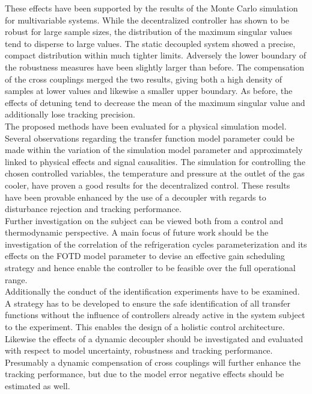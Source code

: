 These effects have been supported by the results of the Monte Carlo simulation for multivariable systems. While the decentralized controller has shown to be robust for large sample sizes, the distribution of the maximum singular values tend to disperse to large values. The static decoupled system showed a precise, compact distribution within much tighter limits. Adversely the lower boundary of the robustness measures have been slightly larger than before. The compensation of the cross couplings merged the two results, giving both a high density of samples at lower values and likewise a smaller upper boundary. As before, the effects of detuning tend to decrease the mean of the maximum singular value and additionally lose tracking precision.\\

The proposed methods have been evaluated for a physical simulation model. Several observations regarding the transfer function model parameter could be made within the variation of the simulation model parameter and approximately linked to physical effects and signal causalities. The simulation for controlling the chosen controlled variables, the temperature and pressure at the outlet of the gas cooler, have proven a good results for the decentralized control. These results have been provable enhanced by the use of a decoupler with regards to disturbance rejection and tracking performance.\\

Further investigation on the subject can be viewed both from a control and thermodynamic perspective. A main focus of future work should be the investigation of the correlation of the refrigeration cycles parameterization and its effects on the FOTD model parameter to devise an effective gain scheduling strategy and hence enable the controller to be feasible over the full operational range.\\

Additionally the conduct of the identification experiments have to be examined. A strategy has to be developed to ensure the safe identification of all transfer functions without the influence of controllers already active in the system subject to the experiment. This enables the design of a holistic control architecture.\\

Likewise the effects of a dynamic decoupler should be investigated and evaluated with respect to model uncertainty, robustness and tracking performance. Presumably a dynamic compensation of cross couplings will further enhance the tracking performance, but due to the model error negative effects should be estimated as well.\\

